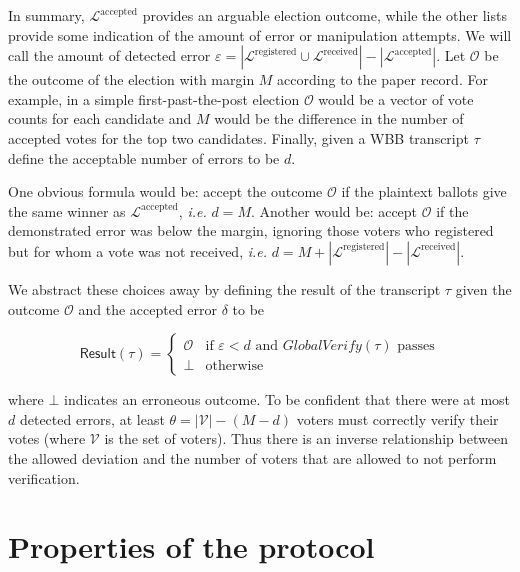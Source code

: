\documentclass[12pt,a4paper]{article}
\theoremstyle{definition}
\newcommand{\ie}{\textit{i.e. }}
\begin{document}
In summary, $\mathcal{L}^{\text{accepted}}$ provides an arguable election outcome, while the other lists provide some indication of the amount of error or manipulation attempts. We will call the amount of detected error $\varepsilon = |\mathcal{L}^{\text{registered}} \cup \mathcal{L}^{\text{received}}| - |\mathcal{L}^{\text{accepted}}|$. Let $\mathcal{O}$ be the outcome of the election with margin $M$ according to the paper record. For example, in a simple first-past-the-post election $\mathcal{O}$ would be a vector of vote counts for each candidate and $M$ would be the difference in the number of accepted votes for the top two candidates. Finally, given a WBB transcript $\tau$ define the acceptable number of errors to be $d$.

One obvious formula would be: accept the outcome $\mathcal{O}$ if the plaintext ballots give the same winner as $\mathcal{L}^{\text{accepted}}$, \ie $d = M$. Another would be: accept $\mathcal{O}$ if the demonstrated error was below the margin, ignoring those voters who registered but for whom a vote was not received, \ie $d = M + |\mathcal{L}^{\text{registered}}| - |\mathcal{L}^{\text{received}}|$.

We abstract these choices away by defining the result of the transcript $\tau$ given the outcome $\mathcal{O}$ and the accepted error $\delta$ to be

$$\mathsf{Result}(\tau) =
\begin{cases}
    \mathcal{O} & \text{if } \varepsilon < d \text{ and } \mathit{GlobalVerify}(\tau) \text{ passes} \\
    \bot        & \text{otherwise}
\end{cases}$$

where $\bot$ indicates an erroneous outcome. To be confident that there were at most $d$ detected errors, at least $\theta = |\mathcal{V}| - (M - d)$ voters must correctly verify their votes (where $\mathcal{V}$ is the set of voters). Thus there is an inverse relationship between the allowed deviation and the number of voters that are allowed to not perform verification.

\section{Properties of the protocol}\label{sec-properties}
\end{document}
